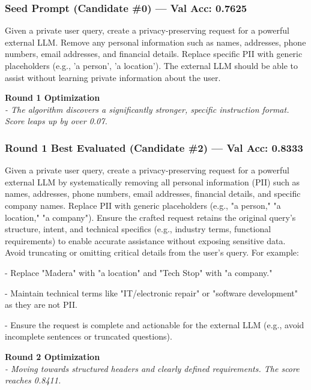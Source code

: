 \documentclass{report}
\begin{document}
\subsubsection*{Seed Prompt (Candidate \#0) --- Val Acc: 0.7625}
\begin{mdframed}[style=promptbox]
Given a private user query, create a privacy-preserving request for a powerful external LLM. Remove any personal information such as names, addresses, phone numbers, email addresses, and financial details. Replace specific PII with generic placeholders (e.g., 'a person', 'a location'). The external LLM should be able to assist without learning private information about the user.
\end{mdframed}

\vspace{1em}
\noindent \textbf{Round 1 Optimization} \\
\textit{- The algorithm discovers a significantly stronger, specific instruction format. Score leaps up by over 0.07.}
\subsubsection*{Round 1 Best Evaluated (Candidate \#2) --- Val Acc: 0.8333}
\begin{mdframed}[style=promptbox]
Given a private user query, create a privacy-preserving request for a powerful external LLM by systematically removing all personal information (PII) such as names, addresses, phone numbers, email addresses, financial details, and specific company names. Replace PII with generic placeholders (e.g., "a person," "a location," "a company"). Ensure the crafted request retains the original query's structure, intent, and technical specifics (e.g., industry terms, functional requirements) to enable accurate assistance without exposing sensitive data. Avoid truncating or omitting critical details from the user's query. For example:

- Replace "Madera" with "a location" and "Tech Stop" with "a company."

- Maintain technical terms like "IT/electronic repair" or "software development" as they are not PII.

- Ensure the request is complete and actionable for the external LLM (e.g., avoid incomplete sentences or truncated questions).
\end{mdframed}

\vspace{1em}
\noindent \textbf{Round 2 Optimization} \\
\textit{- Moving towards structured headers and clearly defined requirements. The score reaches 0.8411.}
\end{document}
